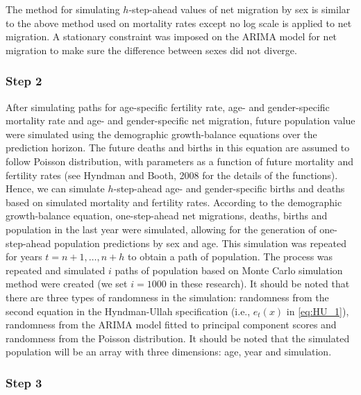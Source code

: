 \documentclass[11pt,a4paper,]{article}
\begin{document}
The method for simulating \(h\)-step-ahead values of net migration by
sex is similar to the above method used on mortality rates except no log
scale is applied to net migration. A stationary constraint was imposed
on the ARIMA model for net migration to make sure the difference between
sexes did not diverge.

\subsubsection*{Step 2}\label{step-2}

After simulating paths for age-specific fertility rate, age- and
gender-specific mortality rate and age- and gender-specific net
migration, future population value were simulated using the demographic
growth-balance equations over the prediction horizon. The future deaths
and births in this equation are assumed to follow Poisson distribution,
with parameters as a function of future mortality and fertility rates
(see Hyndman and Booth, 2008 for the details of the functions). Hence,
we can simulate \(h\)-step-ahead age- and gender-specific births and
deaths based on simulated mortality and fertility rates. According to
the demographic growth-balance equation, one-step-ahead net migrations,
deaths, births and population in the last year were simulated, allowing
for the generation of one-step-ahead population predictions by sex and
age. This simulation was repeated for years \(t=n+1,\dots,n+h\) to
obtain a path of population. The process was repeated and simulated
\(i\) paths of population based on Monte Carlo simulation method were
created (we set \(i=1000\) in these research). It should be noted that
there are three types of randomness in the simulation: randomness from
the second equation in the Hyndman-Ullah specification (i.e., \(e_t(x)\)
in \eqref{eq:HU_1}), randomness from the ARIMA model fitted to principal
component scores and randomness from the Poisson distribution. It should
be noted that the simulated population will be an array with three
dimensions: age, year and simulation.

\subsubsection*{Step 3}\label{step-3}
\end{document}
